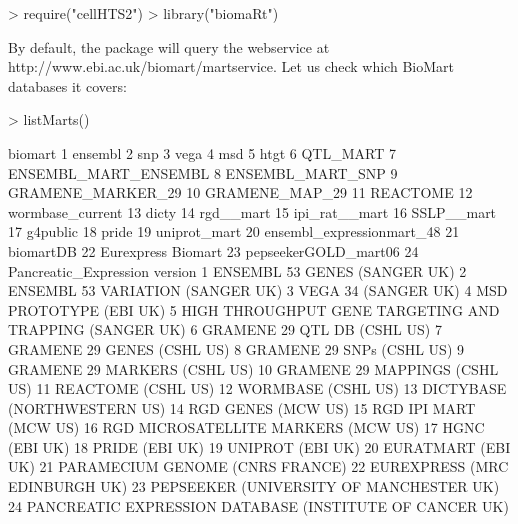 
\begin{Schunk}
\begin{Sinput}
> require("cellHTS2")
> library("biomaRt")
\end{Sinput}
\end{Schunk}
%
By default, the  package will query the webservice at\newline 
http://www.ebi.ac.uk/biomart/martservice.  Let us check
which BioMart databases it covers:
%
\begin{Schunk}
\begin{Sinput}
> listMarts()
\end{Sinput}
\begin{Soutput}
                     biomart
1                    ensembl
2                        snp
3                       vega
4                        msd
5                       htgt
6                   QTL_MART
7       ENSEMBL_MART_ENSEMBL
8           ENSEMBL_MART_SNP
9          GRAMENE_MARKER_29
10            GRAMENE_MAP_29
11                  REACTOME
12          wormbase_current
13                     dicty
14                 rgd__mart
15             ipi_rat__mart
16                SSLP__mart
17                  g4public
18                     pride
19              uniprot_mart
20 ensembl_expressionmart_48
21                 biomartDB
22        Eurexpress Biomart
23      pepseekerGOLD_mart06
24     Pancreatic_Expression
                                                   version
1                             ENSEMBL 53 GENES (SANGER UK)
2                        ENSEMBL 53 VARIATION  (SANGER UK)
3                                     VEGA 34  (SANGER UK)
4                                   MSD PROTOTYPE (EBI UK)
5  HIGH THROUGHPUT GENE TARGETING AND TRAPPING (SANGER UK)
6                              GRAMENE 29 QTL DB (CSHL US)
7                               GRAMENE 29 GENES (CSHL US)
8                                GRAMENE 29 SNPs (CSHL US)
9                             GRAMENE 29 MARKERS (CSHL US)
10                           GRAMENE 29 MAPPINGS (CSHL US)
11                                      REACTOME (CSHL US)
12                                      WORMBASE (CSHL US)
13                             DICTYBASE (NORTHWESTERN US)
14                                      RGD GENES (MCW US)
15                                   RGD IPI MART (MCW US)
16                     RGD MICROSATELLITE MARKERS (MCW US)
17                                           HGNC (EBI UK)
18                                          PRIDE (EBI UK)
19                                        UNIPROT (EBI UK)
20                                      EURATMART (EBI UK)
21                         PARAMECIUM GENOME (CNRS FRANCE)
22                           EUREXPRESS (MRC EDINBURGH UK)
23                 PEPSEEKER (UNIVERSITY OF MANCHESTER UK)
24 PANCREATIC EXPRESSION DATABASE (INSTITUTE OF CANCER UK)
\end{Soutput}
\end{Schunk}
